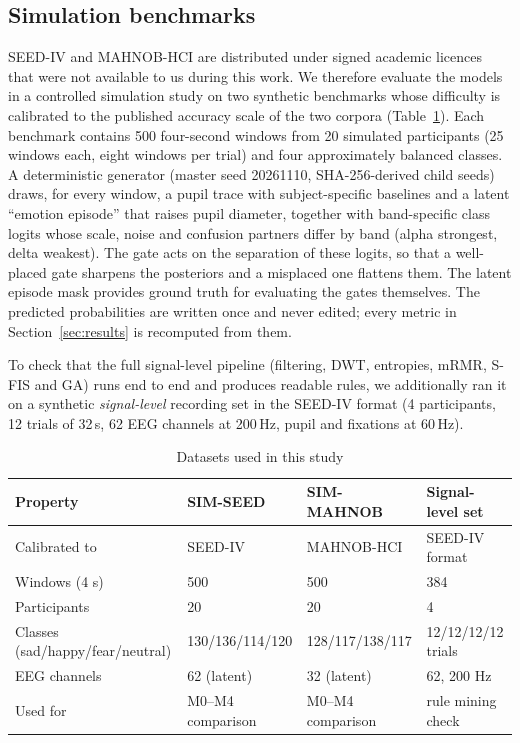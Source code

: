 \documentclass[10pt,twoside]{article}
\newcommand{\simseed}{SIM-SEED}
\newcommand{\simmah}{SIM-MAHNOB}
\begin{document}
\subsection{Simulation benchmarks}
SEED-IV \cite{Zheng2019} and MAHNOB-HCI \cite{Soleymani2012db} are distributed under signed academic licences that were not available to us during this work. We therefore evaluate the models in a controlled simulation study on two synthetic benchmarks whose difficulty is calibrated to the published accuracy scale of the two corpora (Table~\ref{tab:data}). Each benchmark contains 500 four-second windows from 20 simulated participants (25 windows each, eight windows per trial) and four approximately balanced classes. A deterministic generator (master seed 20261110, SHA-256-derived child seeds) draws, for every window, a pupil trace with subject-specific baselines and a latent ``emotion episode'' that raises pupil diameter, together with band-specific class logits whose scale, noise and confusion partners differ by band (alpha strongest, delta weakest). The gate acts on the separation of these logits, so that a well-placed gate sharpens the posteriors and a misplaced one flattens them. The latent episode mask provides ground truth for evaluating the gates themselves. The predicted probabilities are written once and never edited; every metric in Section~\ref{sec:results} is recomputed from them.

To check that the full signal-level pipeline (filtering, DWT, entropies, mRMR, S-FIS and GA) runs end to end and produces readable rules, we additionally ran it on a synthetic \emph{signal-level} recording set in the SEED-IV format (4 participants, 12 trials of 32\,s, 62 EEG channels at 200\,Hz, pupil and fixations at 60\,Hz).

\begin{table}[t]
\caption{Datasets used in this study}
\label{tab:data}
\footnotesize
\begin{tabularx}{\linewidth}{@{}X l l l@{}}
\toprule
Property & \simseed{} & \simmah{} & Signal-level set \\
\midrule
Calibrated to & SEED-IV & MAHNOB-HCI & SEED-IV format \\
Windows (4 s) & 500 & 500 & 384 \\
Participants & 20 & 20 & 4 \\
Classes (sad/happy/fear/neutral) & 130/136/114/120 & 128/117/138/117 & 12/12/12/12 trials \\
EEG channels & 62 (latent) & 32 (latent) & 62, 200 Hz \\
Used for & M0--M4 comparison & M0--M4 comparison & rule mining check \\
\bottomrule
\end{tabularx}
\end{table}
\end{document}
